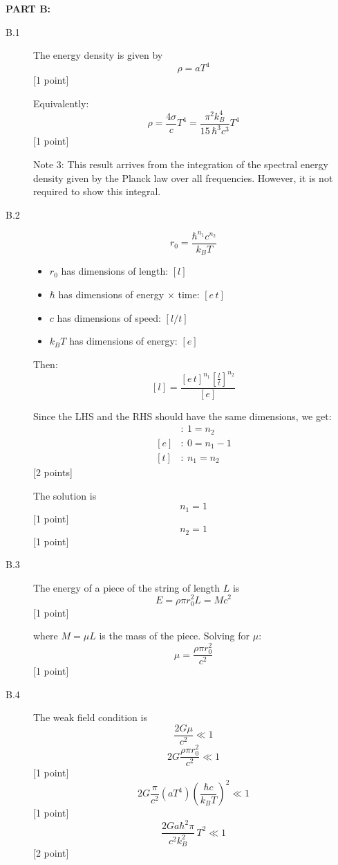 \textbf{PART B:}

\begin{description}
\item[B.1] The energy density is given by
  \[ \rho = aT^4 \]
  \hfill[1 point]

  Equivalently:
  \[ \rho = \frac{4\sigma}{c}T^4
     = \frac{\pi^2 k_B^4}{15\,\hbar^3 c^3}T^4 \]
  \hfill[1 point]

  Note 3: This result arrives from the integration of the spectral energy
  density given by the Planck law over all frequencies. However, it is
  not required to show this integral.

\item[B.2]
  \[ r_0 = \frac{\hbar^{n_1}c^{n_2}}{k_B T} \]
  \begin{itemize}
  \item $r_0$ has dimensions of length: $[l]$
  \item $\hbar$ has dimensions of energy $\times$ time: $[e\,t]$
  \item $c$ has dimensions of speed: $[l/t]$
  \item $k_B T$ has dimensions of energy: $[e]$
  \end{itemize}
  Then:
  \[ [l] = \frac{[e\,t]^{n_1}\left[\frac{l}{t}\right]^{n_2}}{[e]} \]

  Since the LHS and the RHS should have the same dimensions, we get:
  \begin{align*}
  [l]&:\ 1 = n_2\\
  [e]&:\ 0 = n_1 - 1\\
  [t]&:\ n_1 = n_2
  \end{align*}
  \hfill[2 points]

  The solution is
  \[ n_1 = 1 \]
  \hfill[1 point]
  \[ n_2 = 1 \]
  \hfill[1 point]

\item[B.3] The energy of a piece of the string of length $L$ is
  \[ E = \rho\pi r_0^2 L = Mc^2 \]
  \hfill[1 point]

  where $M = \mu L$ is the mass of the piece. Solving for $\mu$:
  \[ \mu = \frac{\rho\pi r_0^2}{c^2} \]
  \hfill[1 point]

\item[B.4] The weak field condition is
  \[ \frac{2G\mu}{c^2}\ll 1 \]
  \[ 2G\frac{\rho\pi r_0^2}{c^2}\ll 1 \]
  \hfill[1 point]
  \[ 2G\frac{\pi}{c^2}\left(aT^4\right)
     \left(\frac{\hbar c}{k_B T}\right)^2\ll 1 \]
  \hfill[1 point]
  \[ \frac{2Ga\hbar^2\pi}{c^2 k_B^2}\,T^2\ll 1 \]
  \hfill[2 point]


\end{description}
